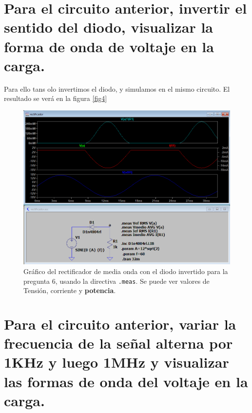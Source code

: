 \documentclass[a4paper]{article} %
\begin{document}
\section{Para el circuito anterior, invertir el sentido del diodo, visualizar la forma de onda de voltaje en la carga.}

Para ello tans olo invertimos el diodo, y simulamos en el mismo circuito. El resultado se verá en la figura \eqref{fig4}

\begin{figure} %
	\centering %
	\includegraphics[scale=0.5]{IMAGENES/fig4} %
	\caption{Gráfico del rectificador de media onda con el diodo invertido para la pregunta 6, usando la directiva \texttt{.meas}. Se puede ver valores de Tensión, corriente y \textbf{potencia}.} %
	\label{fig4} %
\end{figure} %

\section{Para el circuito anterior, variar la frecuencia de la señal alterna por 1KHz y luego 1MHz y visualizar las formas de onda del voltaje en la carga.}
\end{document}
